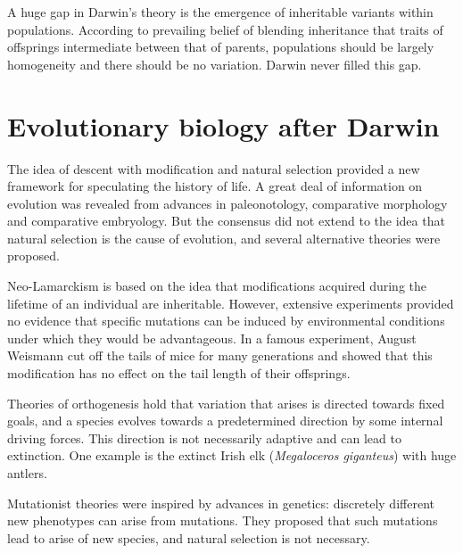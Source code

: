 \documentclass[11pt]{article}
\begin{document}
\begin{sloppypar}
\par

A huge gap in Darwin's theory is the emergence of inheritable variants within populations. 
According to prevailing belief of blending inheritance that traits of offsprings intermediate between that of parents, populations should be largely homogeneity and there should be no variation. 
Darwin never filled this gap. 

\section{Evolutionary biology after Darwin}
The idea of descent with modification and natural selection provided a new framework for speculating the history of life. 
A great deal of information on evolution was revealed from advances in paleonotology, comparative morphology and comparative embryology. 
But the consensus did not extend to the idea that natural selection is the cause of evolution, and several alternative theories were proposed. 

\par

Neo-Lamarckism is based on the idea that modifications acquired during the lifetime of an individual are inheritable. 
However, extensive experiments provided no evidence that specific mutations can be induced by environmental conditions under which they would be advantageous. 
In a famous experiment, August Weismann cut off the tails of mice for many generations and showed that this modification has no effect on the tail length of their offsprings. 

\par

Theories of orthogenesis hold that variation that arises is directed towards fixed goals, and a species evolves towards a predetermined direction by some internal driving forces. 
This direction is not necessarily adaptive and can lead to extinction. 
One example is the extinct Irish elk (\textit{Megaloceros giganteus}) with huge antlers. 

\par

Mutationist theories were inspired by advances in genetics: discretely different new phenotypes can arise from mutations. 
They proposed that such mutations lead to arise of new species, and natural selection is not necessary. 


\end{sloppypar}
\end{document}
